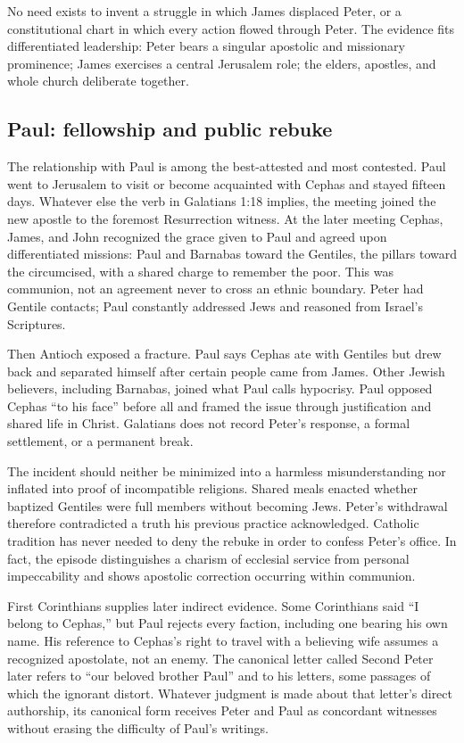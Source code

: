 No need exists to invent a struggle in which James displaced Peter, or a
constitutional chart in which every action flowed through Peter. The evidence
fits differentiated leadership: Peter bears a singular apostolic and
missionary prominence; James exercises a central Jerusalem role; the elders,
apostles, and whole church deliberate together.

\subsection{Paul: fellowship and public rebuke}

The relationship with Paul is among the best-attested and most contested.
Paul went to Jerusalem to visit or become acquainted with Cephas and stayed
fifteen days. Whatever else the verb in Galatians 1:18 implies, the meeting
joined the new apostle to the foremost Resurrection witness. At the later
meeting Cephas, James, and John recognized the grace given to Paul and agreed
upon differentiated missions: Paul and Barnabas toward the Gentiles, the
pillars toward the circumcised, with a shared charge to remember the poor.
This was communion, not an agreement never to cross an ethnic boundary. Peter
had Gentile contacts; Paul constantly addressed Jews and reasoned from
Israel's Scriptures.

Then Antioch exposed a fracture. Paul says Cephas ate with Gentiles but drew
back and separated himself after certain people came from James. Other Jewish
believers, including Barnabas, joined what Paul calls hypocrisy. Paul opposed
Cephas ``to his face'' before all and framed the issue through justification
and shared life in Christ. Galatians does not record Peter's response, a formal
settlement, or a permanent break.

The incident should neither be minimized into a harmless misunderstanding nor
inflated into proof of incompatible religions. Shared meals enacted whether
baptized Gentiles were full members without becoming Jews. Peter's withdrawal
therefore contradicted a truth his previous practice acknowledged. Catholic
tradition has never needed to deny the rebuke in order to confess Peter's
office. In fact, the episode distinguishes a charism of ecclesial service from
personal impeccability and shows apostolic correction occurring within
communion.

First Corinthians supplies later indirect evidence. Some Corinthians said
``I belong to Cephas,'' but Paul rejects every faction, including one bearing
his own name. His reference to Cephas's right to travel with a believing wife
assumes a recognized apostolate, not an enemy. The canonical letter called
Second Peter later refers to ``our beloved brother Paul'' and to his letters,
some passages of which the ignorant distort. Whatever judgment is made about
that letter's direct authorship, its canonical form receives Peter and Paul as
concordant witnesses without erasing the difficulty of Paul's writings.

